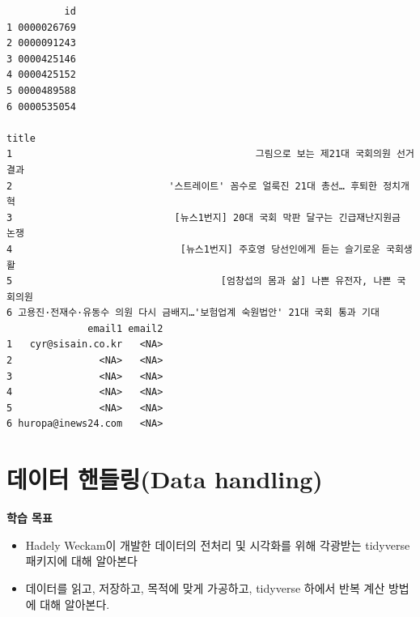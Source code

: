 \documentclass[
  11pt,
]{krantz}
\makeatletter
\newenvironment{Shaded}{\begin{snugshade}}{\end{snugshade}}
\newcommand{\CommentTok}[1]{\textcolor[rgb]{0.37,0.37,0.37}{\textit{#1}}}
\providecommand{\tightlist}{%
  \setlength{\itemsep}{0pt}\setlength{\parskip}{0pt}}
\newenvironment{kframe}{%
\medskip{}
\setlength{\fboxsep}{.8em}
 \def\at@end@of@kframe{}%
 \ifinner\ifhmode%
  \def\at@end@of@kframe{\end{minipage}}%
  \begin{minipage}{\columnwidth}%
 \fi\fi%
 \def\FrameCommand##1{\hskip\@totalleftmargin \hskip-\fboxsep
 \colorbox{shadecolor}{##1}\hskip-\fboxsep
     \hskip-\linewidth \hskip-\@totalleftmargin \hskip\columnwidth}%
 \MakeFramed {\advance\hsize-\width
   \@totalleftmargin\z@ \linewidth\hsize
   \@setminipage}}%
 {\par\unskip\endMakeFramed%
 \at@end@of@kframe}
\newenvironment{rmdblock}[1]
  {
  \begin{itemize}
  \renewcommand{\labelitemi}{
    \raisebox{-.7\height}[0pt][0pt]{
      {\setkeys{Gin}{width=3em,keepaspectratio}\texttt{[image: images/\#1]}}
    }
  }
  \setlength{\fboxsep}{1em}
  \begin{kframe}
  \item
  }
  {
  \end{kframe}
  \end{itemize}
  }
\newenvironment{rmdimportant}
  {\begin{rmdblock}{important}}
  {\end{rmdblock}}
\makeatother
\begin{document}
\begin{verbatim}
          id
1 0000026769
2 0000091243
3 0000425146
4 0000425152
5 0000489588
6 0000535054
                                                                             title
1                                          그림으로 보는 제21대 국회의원 선거 결과
2                           '스트레이트' 꼼수로 얼룩진 21대 총선… 후퇴한 정치개혁
3                            [뉴스1번지] 20대 국회 막판 달구는 긴급재난지원금 논쟁
4                             [뉴스1번지] 주호영 당선인에게 듣는 슬기로운 국회생활
5                                    [엄창섭의 몸과 삶] 나쁜 유전자, 나쁜 국회의원
6 고용진·전재수·유동수 의원 다시 금배지…'보험업계 숙원법안' 21대 국회 통과 기대
              email1 email2
1   cyr@sisain.co.kr   <NA>
2               <NA>   <NA>
3               <NA>   <NA>
4               <NA>   <NA>
5               <NA>   <NA>
6 huropa@inews24.com   <NA>
\end{verbatim}

\begin{Shaded}
\end{Shaded}

\normalsize

\hypertarget{data-handling}{%
\chapter{데이터 핸들링(Data handling)}\label{data-handling}}

\footnotesize

\begin{rmdimportant}
\begin{rmdimportant}

\textbf{학습 목표}

\begin{itemize}
\tightlist
\item
  Hadely Weckam이 개발한 데이터의 전처리 및 시각화를 위해 각광받는 tidyverse 패키지에 대해 알아본다
\item
  데이터를 읽고, 저장하고, 목적에 맞게 가공하고, tidyverse 하에서 반복 계산 방법에 대해 알아본다.
\end{itemize}

\end{rmdimportant}
\end{rmdimportant}
\end{document}
